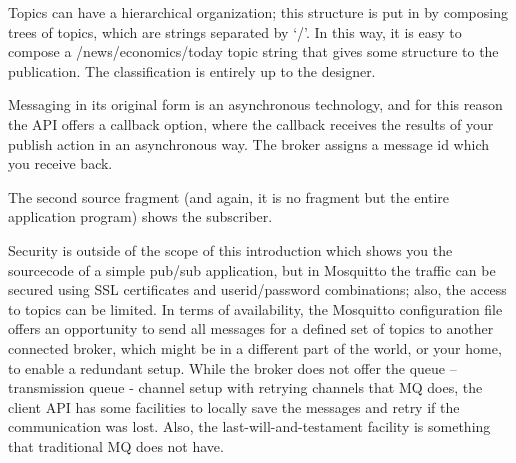 
 
Topics can have a hierarchical organization; this structure is put in by composing trees of topics, which are strings separated by ‘/’. In this way, it is easy to compose a /news/economics/today topic string that gives some structure to the publication. The classification is entirely up to the designer.
 
Messaging in its original form is an asynchronous technology, and for this reason the API offers a callback option, where the callback receives the results of your publish action in an asynchronous way. The broker assigns a message id which you receive back.
 
 
The second source fragment (and again, it is no fragment but the entire application program) shows the subscriber.
 

  
Security is outside of the scope of this introduction which shows you the sourcecode of a simple pub/sub application, but in Mosquitto the traffic can be secured using SSL certificates and userid/password combinations; also, the access to topics can be limited. In terms of availability, the Mosquitto configuration file offers an opportunity to send all messages for a defined set of topics to another connected broker, which might be in a different part of the world, or your home, to enable a redundant setup. While the broker does not offer the queue – transmission queue - channel setup with retrying channels that MQ does, the client API has some facilities to locally save the messages and retry if the communication was lost. Also, the last-will-and-testament facility is something that traditional MQ does not have.
 
 